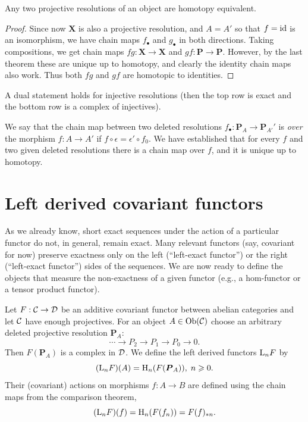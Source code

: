 \begin{cor}
    Any two projective resolutions of an object are homotopy equivalent.
\end{cor}
\begin{proof}
     Since now $\bm X$ is also a projective resolution, and $A=A'$ so that $f=\operatorname{id}$ is an isomorphism, we have chain maps $f_\bullet$ and $g_\bullet$ in both directions. Taking compositions, we get chain maps $fg:\bm{X}\to \bm{X}$ and $gf:\bm{P}\to \bm{P}$. However, by the last theorem these are unique up to homotopy, and clearly the identity chain maps also work. Thus both $fg$ and $gf$ are homotopic to identities.
\end{proof}

\begin{cor}\label{thm comparison for injectives}
    A dual statement holds for injective resolutions (then the top row is exact and the bottom row is a complex of injectives).
\end{cor}

\begin{defn}
    We say that the chain map between two deleted resolutions $f_\bullet:\bm{P}_A\to \bm{P}_{A'}'$ is \emph{over} the morphism $f:A\to A'$ if $f\circ \epsilon=\epsilon '\circ f_0$. We have established that for every $f$ and two given deleted resolutions there is a chain map over $f$, and it is unique up to homotopy.
\end{defn}


\section{Left derived covariant functors}

As we already know, short exact sequences under the action of a particular functor do not, in general, remain exact. Many relevant functors (say, covariant for now) preserve exactness only on the left (``left-exact functor'') or the right (``left-exact functor'') sides of the sequences. We are now ready to define the objects that measure the non-exactness of a given functor (e.g., a hom-functor or a tensor product functor).

\begin{defn}
    Let $F:\mathcal{C}\to \mathcal{D}$ be an additive covariant functor between abelian categories and let $\mathcal{C}$ have enough projectives. For an object $A\in \operatorname{Ob}(\mathcal{C})$ choose an arbitrary deleted projective resolution $\bm{P}_A$:
    \[\cdots \to P_2\to P_1\to P_0 \to 0.\]
    Then $F(\bm{P}_A)$ is a complex in $\mathcal{D}$. We define the left derived functors $\mathrm{L}_nF$ by 
    \[(\mathrm{L}_n F) (A)=\mathrm{H}_n(F(\boldsymbol{P}_A)), \; n\geqslant 0.\]
    Their (covariant) actions on morphisms $f:A\to B$ are defined using the chain maps from the comparison theorem, \[(\mathrm{L}_n F)(f)=\mathrm{H}_n(F(f_n))=F(f)_{\ast n}.\]
\end{defn}

